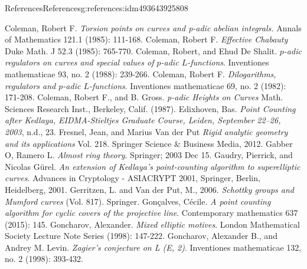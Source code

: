 \documentclass[oneside,10pt,]{book}
\numberwithin{equation}{section}
\begin{document}
\begin{references-chapter-numberless}{References}{}{References}{}{}{g:references:idm493643925808}
\begin{thebibliography}{9}
\hypertarget{x:biblio:bib-coleman-torsion}{}Coleman, Robert F.  \textit{Torsion points on curves and p-adic abelian integrals.} Annals of Mathematics 121.1 (1985): 111-168.
\hypertarget{x:biblio:bib-coleman-chabauty}{}Coleman, Robert F.  \textit{Effective Chabauty} Duke Math. J 52.3 (1985): 765-770.
\hypertarget{x:biblio:bib-coleman-de-shalit}{}Coleman, Robert, and Ehud De Shalit. \textit{\(p\)-adic regulators on curves and special values of \(p\)-adic \(L\)-functions}. Inventiones mathematicae 93, no. 2 (1988): 239-266.
\hypertarget{x:biblio:bib-coleman-dilogs}{}Coleman, Robert F. \textit{Dilogarithms, regulators and \(p\)-adic \(L\)-functions}. Inventiones mathematicae 69, no. 2 (1982): 171-208.
\hypertarget{x:biblio:bib-coleman-gross}{}Coleman, Robert F., and B. Gross. \textit{p-adic Heights on Curves} Math. Sciences Research Inst., Berkeley, Calif. (1987).
\hypertarget{x:biblio:bib-edixhoven-after}{}Edixhoven, Bas. \textit{Point Counting after Kedlaya, EIDMA-Stieltjes Graduate Course, Leiden, September 22–26, 2003}, n.d., 23.
\hypertarget{x:biblio:bib-fresnel-van-der-put}{}Fresnel, Jean, and Marius Van der Put \textit{Rigid analytic geometry and its applications} Vol. 218. Springer Science \& Business Media, 2012.
\hypertarget{x:biblio:bib-gabber-ramero}{}Gabber O, Ramero L. \textit{Almost ring theory}. Springer; 2003 Dec 15.
\hypertarget{x:biblio:bib-gaudry-gurel}{}Gaudry, Pierrick, and Nicolas Gürel. \textit{An extension of Kedlaya's point-counting algorithm to superelliptic curves}. Advances in Cryptology - ASIACRYPT 2001, Springer, Berlin, Heidelberg, 2001.
\hypertarget{x:biblio:bib-gerritzen-van-der-put}{}Gerritzen, L. and Van der Put, M., 2006. \textit{Schottky groups and Mumford curves} (Vol. 817). Springer.
\hypertarget{x:biblio:bib-goncalves}{}Gonçalves, Cécile. \textit{A point counting algorithm for cyclic covers of the projective line}. Contemporary mathematics 637 (2015): 145.
\hypertarget{x:biblio:bib-goncharov-mixed}{}Goncharov, Alexander. \textit{Mixed elliptic motives}. London Mathematical Society Lecture Note Series (1998): 147-222.
\hypertarget{x:biblio:bib-gl}{}Goncharov, Alexander B., and Andrey M. Levin. \textit{Zagier's conjecture on L (E, 2)}. Inventiones mathematicae 132, no. 2 (1998): 393-432.

\end{thebibliography}
\end{references-chapter-numberless}
\end{document}
